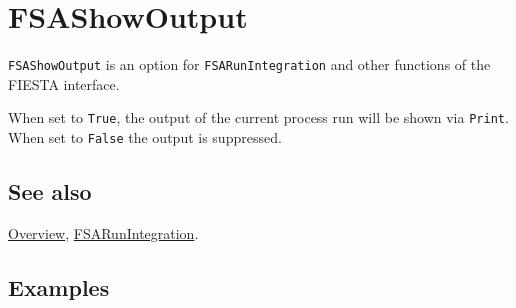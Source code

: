\documentclass[../FeynHelpersManual.tex]{subfiles}
\begin{document}
\hypertarget{fsashowoutput}{
\section{FSAShowOutput}\label{fsashowoutput}}

\texttt{FSAShowOutput} is an option for \texttt{FSARunIntegration} and
other functions of the FIESTA interface.

When set to \texttt{True}, the output of the current process run will be
shown via \texttt{Print}. When set to \texttt{False} the output is
suppressed.

\subsection{See also}

\hyperlink{toc}{Overview},
\hyperlink{fsarunintegration}{FSARunIntegration}.

\subsection{Examples}
\end{document}
